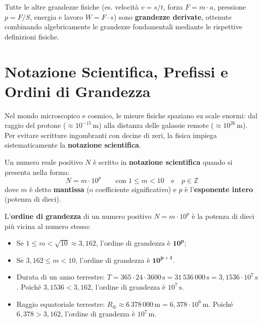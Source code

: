 \documentclass[11pt,a4paper,oneside]{report}
\begin{document}
Tutte le altre grandezze fisiche (es. velocità $v = s/t$, forza $F = m \cdot a$, pressione $p = F/S$, energia e lavoro $W = F \cdot s$) sono \textbf{grandezze derivate}, ottenute combinando algebricamente le grandezze fondamentali mediante le rispettive definizioni fisiche.

\section{Notazione Scientifica, Prefissi e Ordini di Grandezza}
Nel mondo microscopico e cosmico, le misure fisiche spaziano su scale enormi: dal raggio del protone ($\approx 10^{-15}\,\text{m}$) alla distanza delle galassie remote ($\approx 10^{26}\,\text{m}$). Per evitare scritture ingombranti con decine di zeri, la fisica impiega sistematicamente la \textbf{notazione scientifica}.

\begin{definizione}
Un numero reale positivo $N$ è scritto in \textbf{notazione scientifica} quando si presenta nella forma:
\[
N = m \cdot 10^p \qquad \text{con } 1 \le m < 10 \quad \text{e} \quad p \in \mathbb{Z}
\]
dove $m$ è detto \textbf{mantissa} (o coefficiente significativo) e $p$ è l'\textbf{esponente intero} (potenza di dieci).
\end{definizione}

\begin{definizione}
L'\textbf{ordine di grandezza} di un numero positivo $N = m \cdot 10^p$ è la potenza di dieci più vicina al numero stesso:
\begin{itemize}
  \item Se $1 \le m < \sqrt{10} \approx 3{,}162$, l'ordine di grandezza è $\mathbf{10^p}$;
  \item Se $3{,}162 \le m < 10$, l'ordine di grandezza è $\mathbf{10^{p+1}}$.
\end{itemize}
\end{definizione}

\begin{commento}
\begin{itemize}
  \item Durata di un anno terrestre: $T = 365 \cdot 24 \cdot 3600\,\text{s} = 31\,536\,000\,\text{s} = 3{,}1536 \cdot 10^7\,\text{s}$. Poiché $3{,}1536 < 3{,}162$, l'ordine di grandezza è $10^7\,\text{s}$.
  \item Raggio equatoriale terrestre: $R_\oplus \approx 6\,378\,000\,\text{m} = 6{,}378 \cdot 10^6\,\text{m}$. Poiché $6{,}378 > 3{,}162$, l'ordine di grandezza è $10^7\,\text{m}$.
\end{itemize}
\end{commento}
\end{document}
